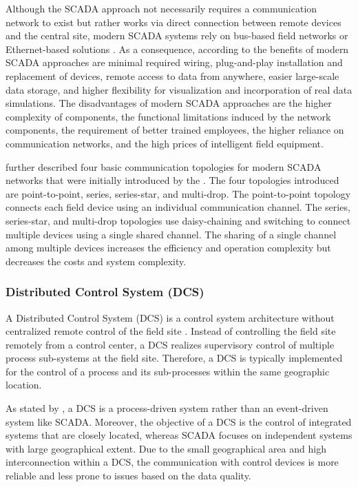 Although the SCADA approach not necessarily requires a communication network to exist but rather works via direct connection between remote devices and the central site, modern SCADA systems rely on bus-based field networks or Ethernet-based solutions \cite{bailey2003}.
As a consequence, according to \citeauthor{bailey2003} the benefits of modern SCADA approaches are minimal required wiring, plug-and-play installation and replacement of devices, remote access to data from anywhere, easier large-scale data storage, and higher flexibility for visualization and incorporation of real data simulations.
The disadvantages of modern SCADA approaches are the higher complexity of components, the functional limitations induced by the network components, the requirement of better trained employees, the higher reliance on communication networks, and the high prices of intelligent field equipment.

\citeauthor{Stouffer2023} \cite{Stouffer2023} further described four basic communication topologies for modern SCADA networks that were initially introduced by the \citeauthor{aga2006} \cite{aga2006}.
The four topologies introduced are point-to-point, series, series-star, and multi-drop.
The point-to-point topology connects each field device using an individual communication channel.
The series, series-star, and multi-drop topologies use daisy-chaining and switching to connect multiple devices using a single shared channel.
The sharing of a single channel among multiple devices increases the efficiency and operation complexity but decreases the costs and system complexity.

\subsubsection{Distributed Control System (DCS)}
A Distributed Control System (DCS) is a control system architecture without centralized remote control of the field site \cite{Stouffer2023}.
Instead of controlling the field site remotely from a control center, a DCS realizes supervisory control of multiple process sub-systems at the field site.
Therefore, a DCS is typically implemented for the control of a process and its sub-processes within the same geographic location.

As stated by \citeauthor{Galloway2013} \cite{Galloway2013}, a DCS is a process-driven system rather than an event-driven system like SCADA.
Moreover, the objective of a DCS is the control of integrated systems that are closely located, whereas SCADA focuses on independent systems with large geographical extent. 
Due to the small geographical area and high interconnection within a DCS, the communication with control devices is more reliable and less prone to issues based on the data quality.

